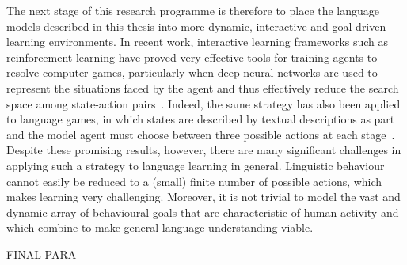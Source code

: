 The next stage of this research programme is therefore to place the language models described in this thesis into more dynamic, interactive and goal-driven learning environments. In recent work, interactive learning frameworks such as reinforcement learning have proved very effective tools for training agents to resolve computer games, particularly when deep neural networks are used to represent the situations faced by the agent and thus effectively reduce the search space among state-action pairs~\citep{mnih2015human}. Indeed, the same strategy has also been applied to language games, in which states are described by textual descriptions as part and the model agent must choose between three possible actions at each stage~\citep{narasimhan2015language}. Despite these promising results, however, there are many significant challenges in applying such a strategy to language learning in general. Linguistic behaviour cannot easily be reduced to a (small) finite number of possible actions, which makes learning very challenging. Moreover, it is not trivial to model the vast and dynamic array of behavioural goals that are characteristic of human activity and which combine to make general language understanding viable. 

FINAL PARA